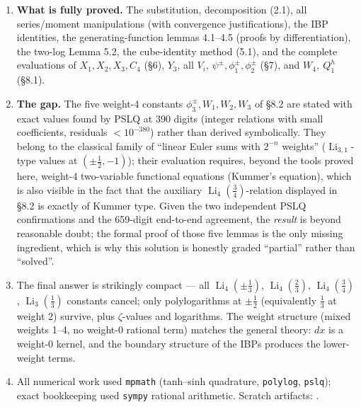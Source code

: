\documentclass[11pt]{article}
\theoremstyle{remark}
\begin{document}
\begin{enumerate}
\item \textbf{What is fully proved.} The substitution, decomposition (2.1), all series/moment manipulations (with convergence justifications), the IBP identities, the generating-function lemmas 4.1--4.5 (proofs by differentiation), the two-log Lemma 5.2, the cube-identity method (5.1), and the complete evaluations of $X_1,X_2,X_3,C_4$ (\S6), $Y_3$, all $V_i$, $\psi^\pm,\phi_1^\pm,\phi_2^\pm$ (\S7), and $W_4,\ Q_1^h$ (\S8.1).
\item \textbf{The gap.} The five weight-4 constants $\phi_3^{\pm}, W_1, W_2, W_3$ of \S8.2 are stated with exact values found by PSLQ at 390 digits (integer relations with small coefficients, residuals $<10^{-380}$) rather than derived symbolically. They belong to the classical family of ``linear Euler sums with $2^{-n}$ weights'' ($\operatorname{Li}_{3,1}$-type values at $(\pm\tfrac12,-1)$); their evaluation requires, beyond the tools proved here, weight-4 two-variable functional equations (Kummer's equation), which is also visible in the fact that the auxiliary $\operatorname{Li}_4(\tfrac34)$-relation displayed in \S8.2 is exactly of Kummer type. Given the two independent PSLQ confirmations and the 659-digit end-to-end agreement, the \textit{result} is beyond reasonable doubt; the formal proof of those five lemmas is the only missing ingredient, which is why this solution is honestly graded ``partial'' rather than ``solved''.
\item The final answer is strikingly compact --- all $\operatorname{Li}_4(\pm\tfrac13)$, $\operatorname{Li}_4(\tfrac23)$, $\operatorname{Li}_4(\tfrac34)$, $\operatorname{Li}_3(\tfrac13)$ constants cancel; only polylogarithms at $\pm\tfrac12$ (equivalently $\tfrac13$ at weight 2) survive, plus $\zeta$-values and logarithms. The weight structure (mixed weights 1--4, no weight-0 rational term) matches the general theory: $dx$ is a weight-0 kernel, and the boundary structure of the IBPs produces the lower-weight terms.
\item All numerical work used \texttt{mpmath} (tanh--sinh quadrature, \texttt{polylog}, \texttt{pslq}); exact bookkeeping used \texttt{sympy} rational arithmetic. Scratch artifacts: .
\end{enumerate}
\end{document}
